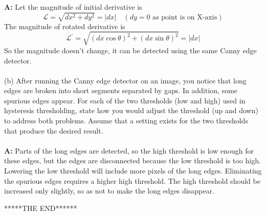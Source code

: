 \documentclass[english,a4paper,12pt]{article}
\begin{document}
\begin{enumerate}
{\textbf{A:} Let the magnitude of initial  derivative is
$$
\mathcal{L}=\sqrt{d x^{2}+d y^{2}}=|d x|\quad (dy=0 \text{ as point is on X-axis})
$$
The magnitude of rotated derivative is
$$
\mathcal{L}^{\prime}=\sqrt{(d x \cos \theta)^{2}+(d x \sin \theta)^{2}}=|d x|
$$
So the magnitude doesn't change, it can be detected using the same Canny edge detector. \\~\\
(b) After running the Canny edge detector on an image, you notice that long edges are broken into short segments separated by gaps. In addition, some spurious edges appear. For each of the two thresholds (low and high) used in hysteresis thresholding, state how you would adjust the threshold (up and down) to address both problems. Assume that a setting exists for the two thresholds that produce the desired result. \\~\\
\textbf{A:}  Parts of the long edges are
detected, so the high threshold is low enough for these edges, but the edges are disconnected because the low threshold is too high. Lowering the low threshold will include
more pixels of the long edges. Eliminating the spurious edges requires a higher high
threshold. The high threshold should be increased only slightly, so as not to make the
long edges disappear.
}
\end{enumerate}
\center ******THE END******
\newpage    
\end{document}
